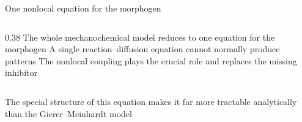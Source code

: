 \begin{frame}{One nonlocal equation for the morphogen}
\begin{columns}[c,onlytextwidth]
    \begin{column}{0.38\textwidth}
        {The whole mechanochemical model reduces to one equation for the morphogen}
      \vspace{-0.04cm}
        {A single reaction--diffusion equation cannot normally produce patterns}
      \vspace{-0.04cm}
        {The nonlocal coupling plays the crucial role and replaces the missing inhibitor}
    \end{column}
  \end{columns}

  \vspace{0.24cm}

  \begin{center}
    {\color{HydraMuted}\fontsize{7.4}{9.1}\selectfont
      The special structure of this equation makes it far more tractable analytically
      than the Gierer--Meinhardt model
    \par}
  \end{center}

\end{frame}


